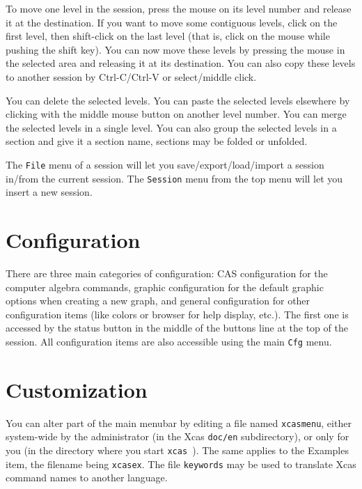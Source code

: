 \documentclass{article}
\newcommand{\xcas}{{\tt xcas }}
\begin{document}
To move one level in the session, press the mouse on its
level number and release it at the destination.
If you want to move some contiguous levels, click on
the first level, then shift-click on the last level (that
is, click on the mouse while pushing the shift key).
You can now move these levels by pressing the mouse in the
selected area and releasing it at its destination.
You can also copy these levels to another session by 
Ctrl-C/Ctrl-V or select/middle click.

You can delete the selected levels. You can paste the
selected levels elsewhere by clicking with the middle mouse button 
on another level number. You can
merge the selected levels in a single level.
You can also group the selected levels in a section and
give it a section name, sections may be folded or unfolded.

The \verb|File| menu of a session will let you save/export/load/import
a session in/from the current session. The \verb|Session| menu 
from the top menu will let you insert a new session.

\section{Configuration}
There are three main categories of configuration: CAS configuration
for the computer algebra commands, graphic configuration for the
default graphic options when creating a new graph, and general
configuration for other configuration items (like colors
or browser for help display, etc.). The first one is
accessed by the status button in the middle of the buttons line at the
top of the session.  All configuration items are also accessible using
the main  \verb|Cfg| menu.

\section{Customization}
You can alter part of the main menubar by editing a file named
{\tt xcasmenu}, either system-wide by the administrator
(in the Xcas {\tt doc/en} subdirectory), or only for you
(in the directory where you start \xcas). The same applies
to the Examples item, the filename being {\tt xcasex}.
The file {\tt keywords} may be used to translate Xcas command names
to another language.
\end{document}
